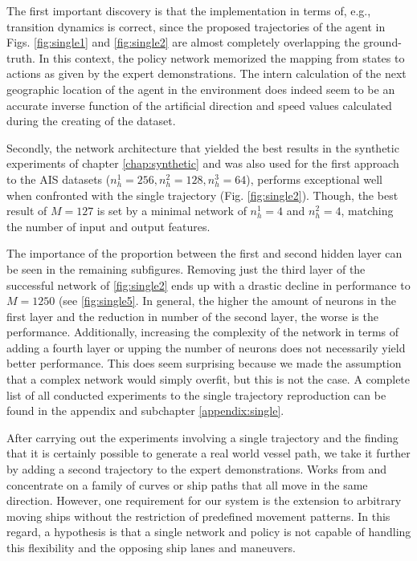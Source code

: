 The first important discovery is that the implementation in terms of, e.g., transition dynamics is correct, since the proposed trajectories of the agent in Figs. \ref{fig:single1} and \ref{fig:single2} are almost completely overlapping the ground-truth. In this context, the policy network memorized the mapping from states to actions as given by the expert demonstrations. The intern calculation of the next geographic location of the agent in the environment does indeed seem to be an accurate inverse function of the artificial direction and speed values calculated during the creating of the dataset.
\par
Secondly, the network architecture that yielded the best results in the synthetic experiments of chapter \ref{chap:synthetic} and was also used for the first approach to the AIS datasets ($n_h^1=256, n_h^2=128, n_h^3=64$), performs exceptional well when confronted with the single trajectory (Fig. \ref{fig:single2}). Though, the best result of $M=127$ is set by a minimal network of $n_h^1=4$ and $n_h^2=4$, matching the number of input and output features.
\par
The importance of the proportion between the first and second hidden layer can be seen in the remaining subfigures. Removing just the third layer of the successful network of \ref{fig:single2} ends up with a drastic decline in performance to $M=1250$ (see \ref{fig:single5}. In general, the higher the amount of neurons in the first layer and the reduction in number of the second layer, the worse is the performance. Additionally, increasing the complexity of the network in terms of adding a fourth layer or upping the number of neurons does not necessarily yield better performance. This does seem surprising because we made the assumption that a complex network would simply overfit, but this is not the case. A complete list of all conducted experiments to the single trajectory reproduction can be found in the appendix and subchapter \ref{appendix:single}.
\par
After carrying out the experiments involving a single trajectory and the finding that it is certainly possible to generate a real world vessel path, we take it further by adding a second trajectory to the expert demonstrations. Works from \cite{edgardo} and \cite{martinsen2018curved} concentrate on a family of curves or ship paths that all move in the same direction. However, one requirement for our system is the extension to arbitrary moving ships without the restriction of predefined movement patterns. In this regard, a hypothesis is that a single network and policy is not capable of handling this flexibility and the opposing ship lanes and maneuvers.
